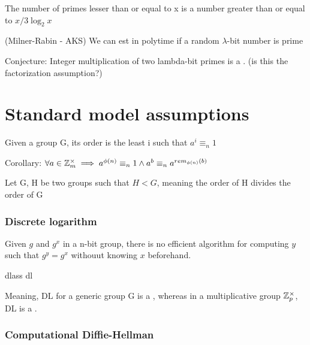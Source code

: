 \begin{theorem}
    The number of primes lesser than or equal to x is a number greater than or equal to $x/3\log_2x$
\end{theorem}

\begin{theorem} (Milner-Rabin - AKS)
    We can est in polytime if a random $\lambda$-bit number is prime
\end{theorem}

Conjecture: Integer multiplication of two lambda-bit primes is a \owf. (is this the factorization assumption?)

\section{Standard model assumptions}

Given a group G, its order is the least i such that $a^i \equiv_n 1$ 

Corollary: $\forall a \in \mathbb{Z}_m^\times \implies a^{\phi(n)} \equiv_n 1 \wedge a^b \equiv_n a^{rem_{\phi(n)}(b)}$

\begin{theorem}
    Let G, H be two groups such that $H < G$, meaning the order of H divides the order of G
\end{theorem}


\subsubsection{Discrete logarithm}

Given $g$ and $g^x$ in a n-bit group, there is no efficient algorithm for computing $y$ such that $g^y = g^x$ withouut knowing $x$ beforehand.

\begin{cryptogame}
    {dlass}
    {}
    {dl}


    
\end{cryptogame}

Meaning, DL for a generic group G is a \owf, whereas in a multiplicative group $\mathbb{Z}_p^\times$, DL is a \owp.

\subsubsection{Computational Diffie-Hellman}

